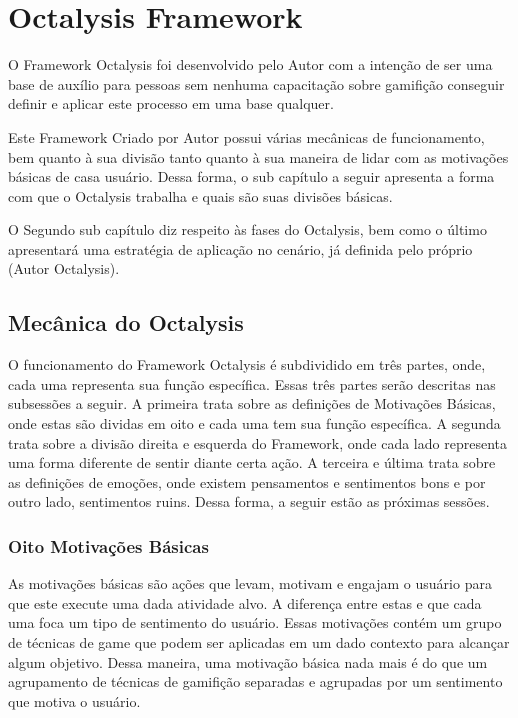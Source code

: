 \section{Octalysis Framework}
\label{sub:octalysisframework}
O Framework Octalysis foi desenvolvido pelo Autor com a intenção de ser uma
base de auxílio para pessoas sem nenhuma capacitação sobre gamifição
conseguir definir e aplicar este processo em uma base qualquer.

Este Framework Criado por Autor possui várias mecânicas de funcionamento,
bem quanto à sua divisão tanto quanto à sua maneira de lidar com as
motivações básicas de casa usuário. Dessa forma, o sub capítulo a seguir
apresenta a forma com que o Octalysis trabalha e quais são suas divisões básicas.

O Segundo sub capítulo diz respeito às fases do Octalysis, bem como o último
apresentará uma estratégia de aplicação no cenário, já definida pelo próprio
(Autor Octalysis).


\subsection{Mecânica do Octalysis}
\label{sub:mecanicaoctalysis}
O funcionamento do Framework Octalysis é subdividido em três partes, onde,
cada uma representa sua função específica. Essas três partes serão descritas
nas subsessões a seguir. A primeira trata sobre as definições de Motivações
Básicas, onde estas são dividas em oito e cada uma tem sua função específica.
A segunda trata sobre a divisão direita e esquerda do Framework, onde cada
lado representa uma forma diferente de sentir diante certa ação.
A terceira e última trata sobre as definições de emoções, onde existem
pensamentos e sentimentos bons e por outro lado, sentimentos ruins.
Dessa forma, a seguir estão as próximas sessões.

\subsubsection{Oito Motivações Básicas}
\label{sub:oitomotivacoesbasicas}
As motivações básicas são ações que levam, motivam e engajam
o usuário para que este execute uma dada atividade alvo.
A diferença entre estas e que cada uma foca um tipo de sentimento
do usuário. Essas motivações contém um grupo de técnicas de game
que podem ser aplicadas em um dado contexto para alcançar algum
objetivo. Dessa maneira, uma motivação básica nada mais é do
que um agrupamento de técnicas de gamifição separadas e agrupadas
por um sentimento que motiva o usuário.

